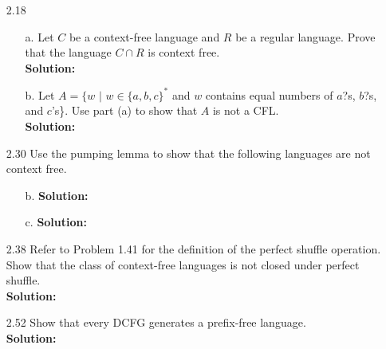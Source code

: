 \begin{enumerate}
\item[2.18]
\begin{enumerate}
\item[a.]Let $C$ be a context-free language and $R$ be a regular language. Prove that the language $C \cap R$ is context free.
\\
\textbf{Solution:} \alreadyanswered

\item[b.]Let $A = \{w$ $|$ $w \in \{a, b, c\}^*$ and $w$ contains equal numbers of $a$?s, $b$?s, and $c$'s\}. Use part (a) to show that $A$ is not a CFL.
\\
\textbf{Solution:} \alreadyanswered
\end{enumerate}

\item[2.30]Use the pumping lemma to show that the following languages are not context free.
\begin{enumerate}
\item[b.]\textbf{Solution:} \alreadyanswered
\item[c.]\textbf{Solution:} \alreadyanswered
\end{enumerate}

\item[2.38]Refer to Problem 1.41 for the definition of the perfect shuffle operation. Show that the class of context-free languages is not closed under perfect shuffle.
\\
\textbf{Solution:} \alreadyanswered

\item[2.52]Show that every DCFG generates a prefix-free language.
\\
\textbf{Solution:} \alreadyanswered

\end{enumerate}